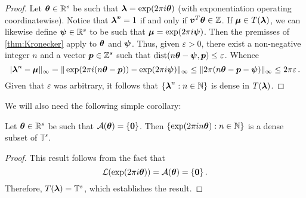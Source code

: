 \begin{proof}
Let $\boldsymbol{\theta} \in \mathbb{R}^{s}$ be such that $\boldsymbol{\lambda} = \exp(2 \pi i \boldsymbol{\theta})$ (with exponentiation operating coordinatewise). Notice that $\boldsymbol{\lambda}^{\boldsymbol{v}} = 1$ if and only if $\boldsymbol{v}^{T} \boldsymbol{\theta} \in \mathbb{Z}$.
If $\boldsymbol{\mu} \in T(\boldsymbol{\lambda})$, we can likewise define $\boldsymbol{\psi} \in \mathbb{R}^{s}$ to be such that $\boldsymbol{\mu}=\exp(2 \pi i \boldsymbol{\psi})$. Then the premisses of \cref{thm:Kronecker} apply to $\boldsymbol{\theta}$ and $\boldsymbol{\psi}$.
Thus, given $\varepsilon>0$, there exist a non-negative integer $n$ and a vector $\boldsymbol{p} \in \mathbb{Z}^{s}$ such that $\operatorname{dist}(n \boldsymbol{\theta} - \boldsymbol{\psi}, \boldsymbol{p}) \leq \varepsilon$.
Whence
\begin{equation*}
  | \boldsymbol{\lambda}^{n}-\boldsymbol{\mu} \|_{\infty} = \| \exp( 2 \pi i (n\boldsymbol{\theta} - \boldsymbol{p})) - \exp(2 \pi i \boldsymbol{\psi}) \|_{\infty} \leq \| 2 \pi (n\boldsymbol{\theta} -\boldsymbol{p} - \boldsymbol{\psi}) \|_\infty \leq 2 \pi \varepsilon \, .
\end{equation*}
Given that $\varepsilon$ was arbitrary, it follows that $\lbrace \boldsymbol{\lambda}^{n} : n \in \mathbb{N} \rbrace$ is dense in $T(\boldsymbol{\lambda})$.
\end{proof}

We will also need the following simple corollary:
\begin{corollary}
  Let $\boldsymbol{\theta} \in \mathbb{R}^{s}$ be such that ${\cal{A}}(\boldsymbol{\theta}) = \lbrace \boldsymbol{0} \rbrace$. Then $\lbrace \exp(2 \pi i n \boldsymbol{\theta}) : n \in \mathbb{N} \rbrace$ is a dense subset of $\mathbb{T}^s$.
\label{corl:kronecker}
\end{corollary}
\begin{proof}
This result follows from the fact that
\begin{equation*}
  {\cal{L}}(\exp(2 \pi i \boldsymbol{\theta})) = {\cal{A}}(\boldsymbol{\theta}) = \lbrace \boldsymbol{0} \rbrace \, .
\end{equation*}
Therefore, $T(\boldsymbol{\lambda}) = \mathbb{T}^{s}$, which establishes the result.
\end{proof}
